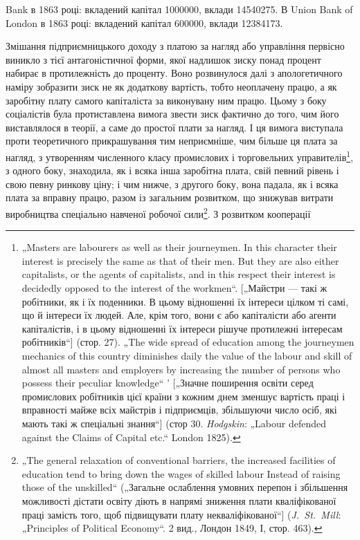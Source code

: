 \parcont{}  %
Bank в 1863 році: вкладений капітал \num{1000000},
вклади \num{14540275}. В Union Bank of London в
1863 році: вкладений капітал \num{600000}, вклади
\num{12384173}.

Змішання підприємницького доходу з платою за нагляд
або управління первісно виникло з тієї антагоністичної форми,
якої надлишок зиску понад процент набирає в протилежність
до проценту. Воно розвинулося далі з апологетичного наміру
зобразити зиск не як додаткову вартість, тобто неоплачену працю,
а як заробітну плату самого капіталіста за виконувану ним працю.
Цьому з боку соціалістів була протиставлена вимога звести зиск
фактично до того, чим його виставлялося в теорії, а саме до простої
плати за нагляд. І ця вимога виступала проти теоретичного
прикрашування тим неприємніше, чим більше ця плата за нагляд,
з утворенням численного класу промислових і торговельних
управителів\footnote{
„Masters are labourers as well as their journeymen. In this character their
interest is precisely the same as that of their men. But they are also either capitalists,
or the agents of capitalists, and in this respect their interest is decidedly
opposed to the interest of the workmen“. [„Майстри — такі ж робітники, як і їх
поденники. В цьому відношенні їх інтереси цілком ті самі, що й інтереси їх людей.
Але, крім того, вони є або капіталісти або агенти капіталістів, і в цьому відношенні
їх інтереси рішуче протилежні інтересам робітників“] (стор. 27). „The
wide spread of education among the journeymen mechanics of this country diminishes
daily the value of the labour and skill of almost all masters and employers
by increasing the number of persons who possess their peculiar knowledge“ ' [„Значне
поширення освіти серед промислових робітників цієї країни з кожним днем
зменшує вартість праці і вправності майже всіх майстрів і підприємців, збільшуючи
число осіб, які мають такі ж спеціальні знання“] (стор 30. \emph{Hodgskin}:
„Labour defended against the Claims of Capital etc.“ London 1825).
}, з одного боку, знаходила, як і всяка інша заробітна
плата, свій певний рівень і свою певну ринкову ціну; і чим
нижче, з другого боку, вона падала, як і всяка плата за вправну
працю, разом із загальним розвитком, що знижував витрати виробництва
спеціально навченої робочої сили\footnote{
„The general relaxation of conventional barriers, the increased facilities of education
tend to bring down the wages of skilled labour Instead of raising those of
the unskilled“ („Загальне ослаблення умовних перепон і збільшення можливості
дістати освіту діють в напрямі зниження плати кваліфікованої праці замість
того, щоб підвищувати плату некваліфікованої“] (\emph{J.~St.~Mill}: „Principles of Political
Economy“. 2 вид., Лондон 1849, І, стор. 463).
}. З розвитком кооперації

